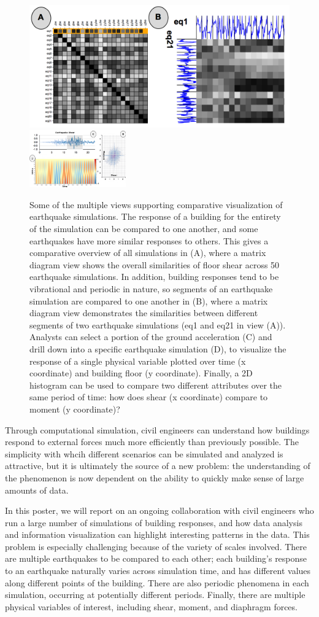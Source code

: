 \begin{figure}
      \centering
      \includegraphics[width=.49\textwidth]{figs/vis1} %
      \includegraphics[width=0.37\textwidth]{figs/vis2}
        \caption{Some of the multiple views supporting comparative visualization of earthquake simulations. The response of a building for the entirety of the simulation can be compared to one another, and some earthquakes have more similar responses to others. This gives a comparative overview of all simulations in (A), where a matrix diagram view shows the overall similarities of floor shear across 50 earthquake simulations. In addition, building responses tend to be vibrational and periodic in nature, so segments of an earthquake simulation are compared to one another in (B), where a matrix diagram view demonstrates the similarities between different segments of two earthquake simulations (eq1 and eq21 in view (A)). Analysts can select a portion of the ground acceleration (C) and drill down into a specific earthquake simulation (D), to visualize the response of a single physical variable plotted over time (x coordinate) and building floor (y coordinate). Finally, a 2D histogram can be used to compare two different attributes over the same period of time: how does shear (x coordinate) compare to moment (y coordinate)?\label{fig:teaser}}
\end{figure}

Through computational simulation, civil engineers can understand how buildings respond to external forces much more efficiently than previously possible.
The simplicity with whcih different scenarios can be simulated and analyzed is attractive, but it is ultimately the source of a new problem: the understanding of the phenomenon is now dependent on the ability to quickly make sense of large amounts of data.

In this poster, we will report on an ongoing collaboration with civil engineers who run a large number of simulations of building responses, and how data analysis and information visualization can highlight interesting patterns in the data.
This problem is especially challenging because of the variety of scales involved. There are multiple earthquakes to be compared to each other; each building's response to an earthquake naturally varies across simulation time, and has different values along different points of the building. There are also periodic phenomena in each simulation, occurring at potentially different periods. Finally, there are multiple physical variables of interest, including shear, moment, and diaphragm forces.

